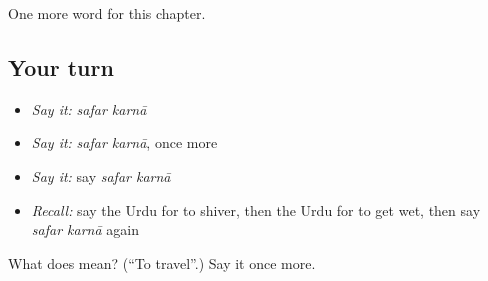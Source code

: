 \begin{grammarlens}[title={What you've built}]
One more word for this chapter.
\end{grammarlens}

\subsection*{Your turn}
\begin{itemize}
\raggedright
  \item \emph{Say it:} \emph{safar karnā}
  \item \emph{Say it:} \emph{safar karnā}, once more
  \item \emph{Say it:} say \emph{safar karnā}
  \item \emph{Recall:} say the Urdu for to shiver, then the Urdu for to get wet, then say \emph{safar karnā} again
\end{itemize}

\begin{tcolorbox}[breakable,colback=teal!4,colframe=teal!35!black,title={Before you move on}]
What does   mean? (\textquotedblleft{}To travel\textquotedblright{}.) Say it once more.
\end{tcolorbox}
